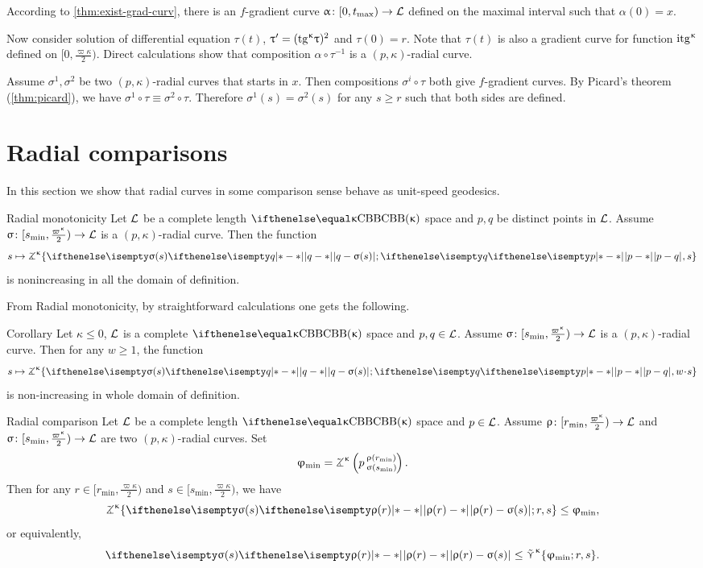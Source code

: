 According to \ref{thm:exist-grad-curv}, there is an $f$-gradient curve $\alpha\:[0,t_{\max})\to \spc{L}$ defined on the maximal interval such that $\alpha(0)=x$.

Now consider solution of differential equation $\tau(t)$, $\uptau'=(\mathrm{tg}^{\upkappa}\uptau)^2$ and $\tau(0)=r$. 
Note that $\tau(t)$ is also a gradient curve  for function $\mathrm{itg}^{\upkappa}$ defined on $[0,\tfrac{\varpi\kappa}2)$.
Direct calculations show that composition $\alpha\circ\tau^{-1}$ 
is a $(p,\kappa)$-radial curve.

 Assume $\sigma^1,\sigma^2$ be two $(p,\kappa)$-radial curves that starts in $x$.
Then compositions $\sigma^i\circ\tau$ both give $f$-gradient curves.
By Picard's theorem (\ref{thm:picard}), we have
$\sigma^1\circ\tau 
\equiv 
\sigma^2\circ\tau$.
Therefore $\sigma^1(s)=\sigma^2(s)$ 
for any $s\ge r$ such that both sides are defined.
\qeds

\section{Radial comparisons}

In this section we show that radial curves in some comparison sense behave as unit-speed geodesics.

\begin{thm}{Radial monotonicity}\label{rad-mon}
Let $\mathcal{L}$ be a complete length $\Alex{\kappa}$ space and
$p, q$ be distinct points in $\mathcal{L}$.
Assume $\sigma\:  [s_{\min},\tfrac{\varpi\kappa}2)\to \spc{L}$
is a $(p,\kappa)$-radial curve.
Then the function 
\[s\mapsto 
\tangle\mc\kappa\{
\dist{q}{\sigma(s)}{};
\dist{p}{q}{},
s
\}\]
is nonincreasing in all the domain of definition.
\end{thm}

From Radial monotonicity,
by straightforward calculations one gets the following.

\begin{thm}{Corollary}\label{cor:rad-comp}
Let $\kappa\le0$,
$\mathcal{L}$ is a complete $\Alex\kappa$ space
and $p, q\in \spc{L}$.
Assume $\sigma\:[s_{\min},\tfrac{\varpi\kappa}2)\to \spc{L}$ is a $(p,\kappa)$-radial curve.
Then for any $w\ge 1$, 
the function
\[
s\mapsto \tangle\mc\kappa\{\dist{q}{\sigma(s)}{};\dist{p}{q}{},w\cdot s\}
\]
is non-increasing in whole domain of definition.
\end{thm}


\begin{thm}{Radial comparison}\label{rad-comp}
Let $\mathcal{L}$ be a complete length $\Alex{\kappa}$ space 
and $p\in \spc{L}$.
Assume $\rho\:  [r_{\min},\tfrac{\varpi\kappa}2)\to \spc{L}$
and    $\sigma\:[s_{\min},\tfrac{\varpi\kappa}2)\to \spc{L}$
are two $(p,\kappa)$-radial curves.
Set
\[\phi_{\min}=\angkk\kappa p{\rho(r_{\min})}{\sigma(s_{\min})}.
\]
Then for any $r\in[r_{\min},\tfrac{\varpi\kappa}2)$ and  $s\in[s_{\min},\tfrac{\varpi\kappa}2)$,
we have
\[
\tangle\mc\kappa\{\dist{\rho(r)}{\sigma(s)}{};r,s\}
\le \phi_{\min},
\]
or equivalently,
\[
\dist{\rho(r)}{\sigma(s)}{}
\le \side\kappa\{\phi_{\min};r,s\}.
\]

\end{thm}


